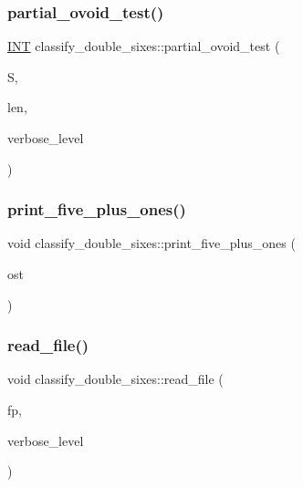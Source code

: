 \subsubsection{\texorpdfstring{partial\+\_\+ovoid\+\_\+test()}{partial\_ovoid\_test()}}
{\footnotesize\ttfamily \mbox{\hyperlink{galois_8h_a09fddde158a3a20bd2dcadb609de11dc}{I\+NT}} classify\+\_\+double\+\_\+sixes\+::partial\+\_\+ovoid\+\_\+test (\begin{DoxyParamCaption}\item[{\mbox{\hyperlink{galois_8h_a09fddde158a3a20bd2dcadb609de11dc}{I\+NT}} $\ast$}]{S,  }\item[{\mbox{\hyperlink{galois_8h_a09fddde158a3a20bd2dcadb609de11dc}{I\+NT}}}]{len,  }\item[{\mbox{\hyperlink{galois_8h_a09fddde158a3a20bd2dcadb609de11dc}{I\+NT}}}]{verbose\+\_\+level }\end{DoxyParamCaption})}

\mbox{\label{classclassify__double__sixes_a4211b29d5115343c52fef8a64d46a7c7}} 
\subsubsection{\texorpdfstring{print\+\_\+five\+\_\+plus\+\_\+ones()}{print\_five\_plus\_ones()}}
{\footnotesize\ttfamily void classify\+\_\+double\+\_\+sixes\+::print\+\_\+five\+\_\+plus\+\_\+ones (\begin{DoxyParamCaption}\item[{ostream \&}]{ost }\end{DoxyParamCaption})}

\mbox{\label{classclassify__double__sixes_a0d027bc3d7ee6dc9dcbd82201c311faf}} 
\subsubsection{\texorpdfstring{read\+\_\+file()}{read\_file()}}
{\footnotesize\ttfamily void classify\+\_\+double\+\_\+sixes\+::read\+\_\+file (\begin{DoxyParamCaption}\item[{ifstream \&}]{fp,  }\item[{\mbox{\hyperlink{galois_8h_a09fddde158a3a20bd2dcadb609de11dc}{I\+NT}}}]{verbose\+\_\+level }\end{DoxyParamCaption})}

